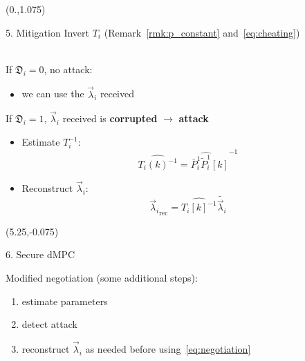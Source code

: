 \documentclass[presentation]{beamer}
\begin{document}
\begin{frame}
  \begin{textblock}{5.1}(0.,1.075)
    \begin{block}{5. Mitigation}
      Invert $T_{i}$ (Remark~\ref{rmk:p_constant} and~\eqref{eq:cheating})\\~\\
      \begin{center}
        \begin{minipage}[c]{.95\textwidth}
          If $\mathfrak{D}_{i}=0$, no attack:
          \begin{itemize}
            \item we can use the $\vec{\lambda}_{i}$ received
          \end{itemize}
          If $\mathfrak{D}_{i}=1$, $\vec{\lambda}_{i}$ received is \textbf{corrupted} $\to$ \textbf{\color{red} attack}
          \begin{itemize}
            \item Estimate $T_{i}^{-1}$:
                  \begin{equation}
                    \widehat{{T_{i}(k)}^{-1}}=\bar{P}_{i}^{1}{\widehat{\tilde{P}_{i}^{1}}[k]}^{-1}
                  \end{equation}
            \item Reconstruct $\vec{\lambda}_{i}$:
                  \begin{equation}
                    \label{eq:lambda_reconstruction}
                    {\vec{\lambda}_{i}}_{\mathrm{rec}}=\widehat{{T_{i}[k]}^{-1}} \tilde{\vec{\lambda}_{i}}
                  \end{equation}
          \end{itemize}
      \end{minipage}
      \end{center}
    \end{block}
  \end{textblock}
\def\seccol{5.25}
\def\thirdcol{10.5}
  \begin{textblock}{5.1}(\seccol,-0.075)
    \begin{block}{6. Secure dMPC}
      \begin{center}
        \begin{minipage}[c]{.965\textwidth}
          Modified negotiation (some additional steps):
          \begin{enumerate}
            \item estimate parameters
            \item detect attack
            \item reconstruct $\vec{\lambda}_{i}$ as needed before using~\eqref{eq:negotiation}

\end{enumerate}
\end{minipage}
\end{center}
\end{block}
\end{textblock}
\end{frame}
\end{document}
